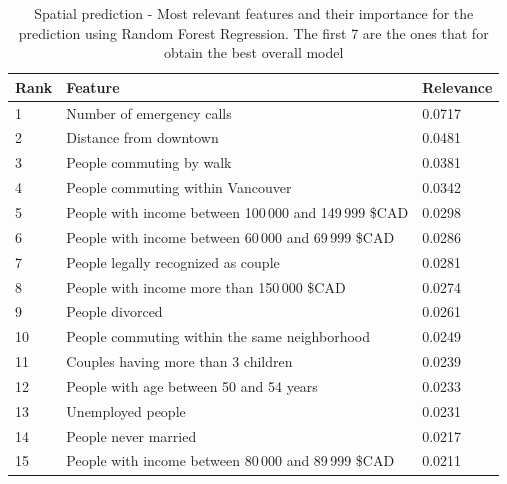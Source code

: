 \begin{table}
\centering
\begin{tabular}{lll}
\toprule
\textbf{Rank} & \textbf{Feature}&\textbf{Relevance} \\ \midrule
1  & Number of emergency calls       & 0.0717             \\ \hline
2  & Distance from downtown  & 0.0481             \\ \hline
3  & People commuting by walk           & 0.0381    \\ \hline
4  & People commuting within Vancouver      & 0.0342   \\ \hline
5  & People with income between  100\,000 and 149\,999 \$CAD   & 0.0298 \\ \hline
6  & People with income between  60\,000 and 69\,999 \$CAD     & 0.0286       \\ \hline
7  & People legally recognized as couple   & 0.0281             \\ \hline
8  & People with income more than 150\,000 \$CAD & 0.0274             \\ \hline
9  & People divorced  & 0.0261             \\ \hline
10  & People commuting within the same neighborhood & 0.0249    \\ \hline
11 & Couples having more than 3 children   & 0.0239             \\ \hline
12 & People with age between 50 and 54 years & 0.0233             \\ \hline
13 &  Unemployed people   & 0.0231   \\ \hline
14  & People never married  & 0.0217             \\ \hline
15  & People with income between  80\,000 and 89\,999 \$CAD  & 0.0211  \\ 
\bottomrule
\end{tabular}
\caption{Spatial prediction - Most relevant features and their importance for the prediction using Random Forest Regression. The first 7 are the ones that for obtain the best overall model}
\label{tab:8_5_featuresranking}
\end{table}

